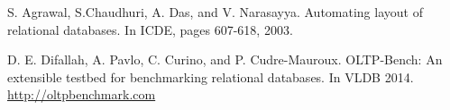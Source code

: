 \documentclass{article}
\begin{document}

\begin{thebibliography}{9}
    S. Agrawal, S.Chaudhuri, A. Das, and V. Narasayya.
    Automating layout of relational databases.
    In ICDE, pages 607-618, 2003.

  D. E. Difallah, A. Pavlo, C. Curino, and P. Cudre-Mauroux.
  OLTP-Bench: An extensible testbed for benchmarking relational databases. 
  In VLDB 2014.
  \url{http://oltpbenchmark.com}
\end{thebibliography}
\end{document}
